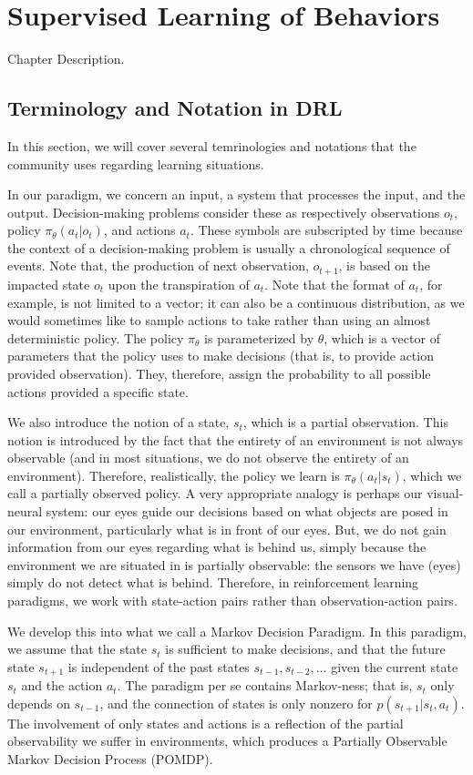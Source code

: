 \chapter{Supervised Learning of Behaviors}
Chapter Description.

\section{Terminology and Notation in DRL}
In this section, we will cover several temrinologies and notations that the community uses regarding learning situations.

In our paradigm, we concern an input, a system that processes the input, and the output.
Decision-making problems consider these as respectively observations $o_t$, policy $\pi_\theta (a_t|o_t)$, and actions $a_t$.
These symbols are subscripted by time because the context of a decision-making problem is usually a chronological sequence of events.
Note that, the production of next observation, $o_{t+1}$, is based on the impacted state $o_t$ upon the transpiration of $a_t$.
Note that the format of $a_t$, for example, is not limited to a vector; it can also be a continuous distribution, as we would sometimes like to sample actions to take rather than using an almost deterministic policy.
The policy $\pi_\theta$ is parameterized by $\theta$, which is a vector of parameters that the policy uses to make decisions (that is, to provide action provided observation).
They, therefore, assign the probability to all possible actions provided a specific state.

We also introduce the notion of a state, $s_t$, which is a partial observation.
This notion is introduced by the fact that the entirety of an environment is not always observable (and in most situations, we do not observe the entirety of an environment).
Therefore, realistically, the policy we learn is $\pi_\theta (a_t|s_t)$, which we call a partially observed policy.
A very appropriate analogy is perhaps our visual-neural system: our eyes guide our decisions based on what objects are posed in our environment, particularly what is in front of our eyes.
But, we do not gain information from our eyes regarding what is behind us, simply because the environment we are situated in is partially observable: the sensors we have (eyes) simply do not detect what is behind.
Therefore, in reinforcement learning paradigms, we work with state-action pairs rather than observation-action pairs.

We develop this into what we call a Markov Decision Paradigm.
In this paradigm, we assume that the state $s_t$ is sufficient to make decisions, and that the future state $s_{t+1}$ is independent of the past states $s_{t-1}, s_{t-2}, \ldots$ given the current state $s_t$ and the action $a_t$.
The paradigm per se contains Markov-ness; that is, $s_t$ only depends on $s_{t-1}$, and the connection of states is only nonzero for $p(s_{t+1} | s_t, a_t)$.
The involvement of only states and actions is a reflection of the partial observability we suffer in environments, which produces a Partially Observable Markov Decision Process (POMDP).

